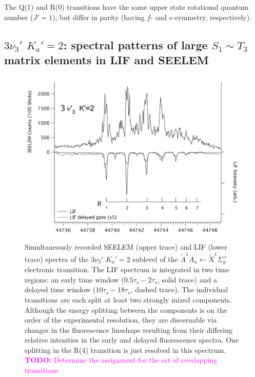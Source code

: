 \documentclass[12pt]{mitthesis}
\newcommand{\TODO} [1]{\textcolor{magenta}{\textbf{TODO:} #1}}
\begin{document}
The Q(1) and R(0) transitions have the same upper state rotational
quantum number ($J'=1$), but differ in parity (having $f$- and
$e$-symmetry, respectively).

%
% 











\subsection{$3\nu_3'$ $K_a'\!=\!2$: spectral patterns of large
  $S_1 \sim T_3$ matrix elements in LIF and SEELEM}



\begin{figure}
  \caption{Simultaneously recorded SEELEM (upper trace) and LIF (lower
    trace) spectra of the $3\nu_3'$ $K_a'\!=\!2$ sublevel of the
    $\tilde{A}^1A_u \leftarrow \tilde{X} ^1\Sigma_g^+$ electronic
    transition.  The LIF spectrum is integrated in two time regions:
    an early time window ($0.5\tau_s-2\tau_s$, solid trace) and a
    delayed time window ($10\tau_s-18\tau_s$, dashed trace).  The
    individual transitions are each split at least two strongly mixed
    components.  Although the energy splitting between the components
    is on the order of the experimental resolution, they are
    discernable via changes in the fluorescence lineshape resulting
    from their differing relative intenities in the early and delayed
    fluorescence spectra.  One splitting in the R(4) transition is
    just resolved in this spectrum.  \TODO{Determine the assignment for
    the set of overlapping transitions.}}
  \label{fig:spectrum-33k2}
  \centering
  \includegraphics[width=7in,angle=90]{acetylene-33k2-r1r7.png}
\end{figure}
\end{document}
